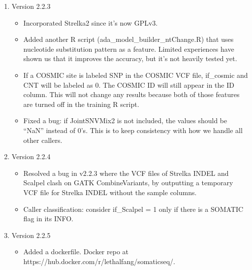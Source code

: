 \documentclass[10pt,letterpaper]{article}
\begin{document}
\begin{sloppypar}
\begin{enumerate}
	\item Version 2.2.3
	
		\begin{itemize}
		
		  \item
		  Incorporated Strelka2 since it's now GPLv3.
		  
		  \item
		  Added another R script (ada\_model\_builder\_ntChange.R) that uses nucleotide substitution pattern as a feature. Limited experiences have shown us that it improves the accuracy, but it's not heavily tested yet. 
		
		  \item
		  If a COSMIC site is labeled SNP in the COSMIC VCF file, if\_cosmic and CNT will be labeled as 0. The COSMIC ID will still appear in the ID column. This will not change any results because both of those features are turned off in the training R script.
		  
		  \item
		  Fixed a bug: if JointSNVMix2 is not included, the values should be ``NaN'' instead of 0's. This is to keep consistency with how we handle all other callers.
		  
		\end{itemize}
	
	
	
	\item Version 2.2.4
	
		\begin{itemize}
		
		  \item
		  Resolved a bug in v2.2.3 where the VCF files of Strelka INDEL and Scalpel clash on GATK CombineVariants, by outputting a temporary VCF file for Strelka INDEL without the sample columns.
		  
		  \item
		  Caller classification: consider if\_Scalpel = 1 only if there is a SOMATIC flag in its INFO. 
		
		\end{itemize}
		
		
	
	\item Version 2.2.5
	
		\begin{itemize}
		  
		  \item
		  Added a dockerfile. Docker repo at https://hub.docker.com/r/lethalfang/somaticseq/. 
		  

\end{itemize}
\end{enumerate}
\end{sloppypar}
\end{document}
